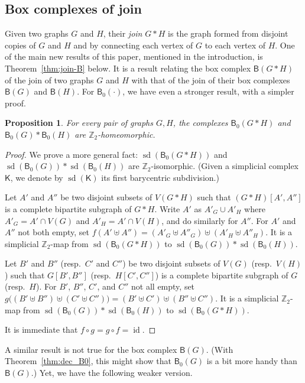 \documentclass[12pt]{amsart}
\newtheorem{proposition}[theorem]{Proposition}
\theoremstyle{definition}
\def\Z{\mathbb{Z}}
\def\K{\mathsf{K}}
\def\B{\mathsf{B}}
\def\sd{\operatorname{sd}}
\begin{document}
\subsection{Box complexes of join} Given two graphs $G$ and $H$, their {\em join} $G * H$ is the graph formed from disjoint copies of $G$ and $H$ and by connecting each vertex of $G$ to each vertex of $H$. One of the main new results of this paper, mentioned in the introduction, is Theorem~\ref{thm:join-B} below. It is a result relating the box complex $\B(G * H)$ of the join of two graphs $G$ and $H$ with that of the join of their box complexes $\B(G)$ and $\B(H)$. For $\B_0(\cdot)$, we have even a stronger result, with a simpler proof.

\begin{proposition}\label{prop:join-B0}
For every pair of graphs $G, H$, the complexes $\B_0(G * H)$ and $\B_0(G) * \B_0(H)$ are $\Z_2$-homeomorphic.
\end{proposition}

\begin{proof}
We prove a more general fact: $\sd(\B_0(G * H))$ and $\sd(\B_0(G)) *\sd(\B_0(H))$ are $\Z_2$-isomorphic. (Given a simplicial complex $\K$, we denote by $\sd(\K)$ its first barycentric subdivision.) 

Let $A'$ and $A''$ be two disjoint subsets of $V(G * H)$ such that $(G*H)[A',A'']$ is a complete bipartite subgraph of $G*H$. Write $A'$ as $A'_G \cup A'_H$ where $A'_G = A' \cap V(G)$ and $A'_H = A' \cap V(H)$, and do similarly for $A''$. For $A'$ and $A''$ not both empty, set
$f(A' \uplus A'') = (A'_G \uplus A''_G) \uplus (A'_H \uplus A''_H)$. It is a simplicial $\Z_2$-map from $\sd(\B_0(G * H))$ to $\sd(\B_0(G)) *\sd(\B_0(H))$. 

Let $B'$ and $B''$ (resp.\ $C'$ and $C''$) be two disjoint subsets of $V(G)$ (resp.\ $V(H)$) such that $G[B',B'']$ (resp.\ $H[C',C'']$) is a complete bipartite subgraph of $G$ (resp.\ $H$). For $B'$, $B''$, $C'$, and $C''$ not all empty, set
$g\big((B'\uplus B'') \uplus (C'\uplus C'')\big) = (B' \uplus C') \uplus (B'' \uplus C'')$. It is a simplicial $\Z_2$-map from $\sd(\B_0(G)) *\sd(\B_0(H))$ to $\sd(\B_0(G * H))$.

It is immediate that $f\circ g = g\circ f= \operatorname{id}$.
\end{proof}

A similar result is not true for the box complex $\B(G)$. (With Theorem~\ref{thm:dec_B0}, this might show that $\B_0(G)$ is a bit more handy than $\B(G)$.) Yet, we have the following weaker version. 
\end{document}

